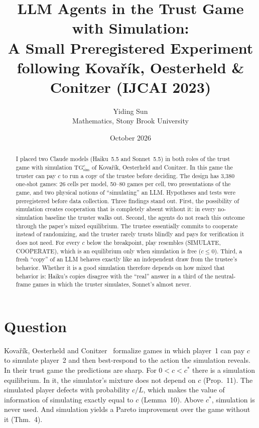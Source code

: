 \documentclass[11pt]{article}
\title{LLM Agents in the Trust Game with Simulation:\\ A Small Preregistered Experiment\\[4pt]
\large following Kova\v{r}\'ik, Oesterheld \& Conitzer (IJCAI 2023)}
\author{Yiding Sun\\ \small Mathematics, Stony Brook University}
\date{October 2026}
\begin{document}
\maketitle

\begin{abstract}
\noindent
I placed two Claude models (Haiku~5.5 and Sonnet~5.5) in both roles of the trust game with simulation $\mathrm{TG}^c_{\mathrm{sim}}$ of Kova\v{r}\'ik, Oesterheld and Conitzer. In this game the truster can pay $c$ to run a copy of the trustee before deciding. The design has 3{,}380 one-shot games: 26 cells per model, 50--80 games per cell, two presentations of the game, and two physical notions of ``simulating'' an LLM. Hypotheses and tests were preregistered before data collection. Three findings stand out. First, the possibility of simulation creates cooperation that is completely absent without it: in every no-simulation baseline the truster walks out. Second, the agents do not reach this outcome through the paper's mixed equilibrium. The trustee essentially commits to cooperate instead of randomizing, and the truster rarely trusts blindly and pays for verification it does not need. For every $c$ below the breakpoint, play resembles (SIMULATE, COOPERATE), which is an equilibrium only when simulation is free ($c\le 0$). Third, a fresh ``copy'' of an LLM behaves exactly like an independent draw from the trustee's behavior. Whether it is a good simulation therefore depends on how mixed that behavior is: Haiku's copies disagree with the ``real'' answer in a third of the neutral-frame games in which the truster simulates, Sonnet's almost never.
\end{abstract}

\section{Question}

Kova\v{r}\'ik, Oesterheld and Conitzer~\cite{kovarik2023} formalize games in which player~1 can pay $c$ to simulate player~2 and then best-respond to the action the simulation reveals. In their trust game the predictions are sharp. For $0<c<c^\ast$ there is a simulation equilibrium. In it, the simulator's mixture does not depend on $c$ (Prop.~11). The simulated player defects with probability $c/L$, which makes the value of information of simulating exactly equal to $c$ (Lemma~10). Above $c^\ast$, simulation is never used. And simulation yields a Pareto improvement over the game without it (Thm.~4).
\end{document}

